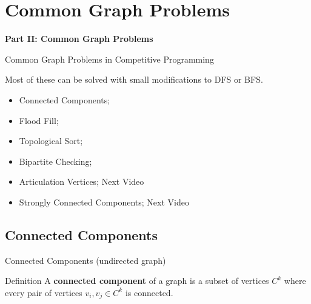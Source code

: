 \section{Common Graph Problems}

\begin{frame}{}
  \begin{center}
    {\bf Part II: Common Graph Problems}
  \end{center}
\end{frame}

\begin{frame}{Common Graph Problems in Competitive Programming}

  Most of these can be solved with small modifications to DFS or BFS.\bigskip

  \begin{itemize}
    \item Connected Components;
    \item Flood Fill;
    \item Topological Sort;
    \item Bipartite Checking;\bigskip

    \item Articulation Vertices; \hfill Next Video
    \item Strongly Connected Components; \hfill Next Video
  \end{itemize}
\end{frame}


\subsection{Connected Components}
\begin{frame}{Connected Components (undirected graph)}
  \begin{block}{Definition}
    A {\bf connected component} of a graph is a subset of vertices $C^k$ where every pair of vertices $v_i, v_j \in C^k$ is connected.\bigskip
  \end{block}

  \vfill
  \begin{center}
  \end{center}
\end{frame}

